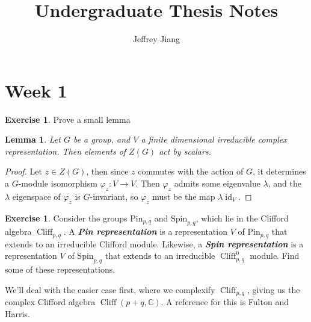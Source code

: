 \documentclass[psamsfonts]{amsart}
\newtheorem*{lem*}{Lemma}
\theoremstyle{definition}
\newtheorem{exer}[thm]{Exercise}
\theoremstyle{remark}
\newcommand{\ib}[1]{\textbf{\textit{#1}}}
\newcommand{\C}{\mathbb{C}}
\newcommand{\Spin}{\mathrm{Spin}}
\newcommand{\Pin}{\mathrm{Pin}}
\DeclareMathOperator{\id}{id}
\DeclareMathOperator{\Cliff}{Cliff}
\begin{document}
%
\author{Jeffrey Jiang}
%
\title{Undergraduate Thesis Notes}
%
\maketitle
%
\setcounter{section}{1}
%
\section*{Week 1}
%
\begin{exer}
Prove a small lemma
\begin{lem*}
Let $G$ be a group, and $V$ a finite dimensional irreducible complex representation. Then elements of $Z(G)$ act by scalars.
\end{lem*}
\end{exer}
\begin{proof}
Let $z \in Z(G)$, then since $z$ commutes with the action of $G$, it determines a $G$-module isomorphism $\varphi_z : V \to V$. Then $\varphi_z$ admits some eigenvalue $\lambda$, and the $\lambda$ eigenspace of $\varphi_z$ is $G$-invariant, so $\varphi_z$ must be the map $\lambda \id_V$.
\end{proof}
%
%
\begin{exer}
Consider the groups $\Pin_{p,q}$ and $\Spin_{p,q}$, which lie in the Clifford algebra $\Cliff_{p,q}$. A \ib{Pin representation} is a representation $V$ of $\Pin_{p,q}$ that extends to an irreducible Clifford module. Likewise, a \ib{Spin representation} is a representation $V$ of $\Spin_{p,q}$ that extends to an irreducible $\Cliff_{p,q}^0$ module. Find some of these representations.
\end{exer}
%
We'll deal with the easier case first, where we complexify $\Cliff_{p,q}$, giving us the complex Clifford algebra $\Cliff(p+q,\C)$. A reference for this is Fulton and Harris. \\
\end{document}
